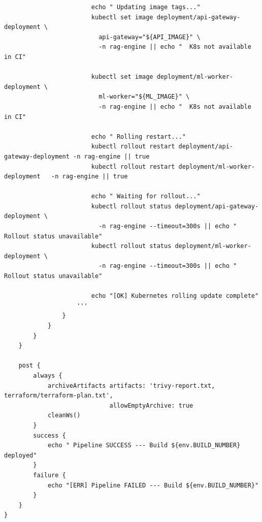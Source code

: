 \documentclass[12pt,a4paper]{report}
\begin{document}
\begin{lstlisting}
                        echo " Updating image tags..."
                        kubectl set image deployment/api-gateway-deployment \
                          api-gateway="${API_IMAGE}" \
                          -n rag-engine || echo "  K8s not available in CI"

                        kubectl set image deployment/ml-worker-deployment \
                          ml-worker="${ML_IMAGE}" \
                          -n rag-engine || echo "  K8s not available in CI"

                        echo " Rolling restart..."
                        kubectl rollout restart deployment/api-gateway-deployment -n rag-engine || true
                        kubectl rollout restart deployment/ml-worker-deployment   -n rag-engine || true

                        echo " Waiting for rollout..."
                        kubectl rollout status deployment/api-gateway-deployment \
                          -n rag-engine --timeout=300s || echo "  Rollout status unavailable"
                        kubectl rollout status deployment/ml-worker-deployment \
                          -n rag-engine --timeout=300s || echo "  Rollout status unavailable"

                        echo "[OK] Kubernetes rolling update complete"
                    '''
                }
            }
        }
    }

    post {
        always {
            archiveArtifacts artifacts: 'trivy-report.txt, terraform/terraform-plan.txt',
                             allowEmptyArchive: true
            cleanWs()
        }
        success {
            echo " Pipeline SUCCESS --- Build ${env.BUILD_NUMBER} deployed"
        }
        failure {
            echo "[ERR] Pipeline FAILED --- Build ${env.BUILD_NUMBER}"
        }
    }
}
\end{lstlisting}
\end{document}
